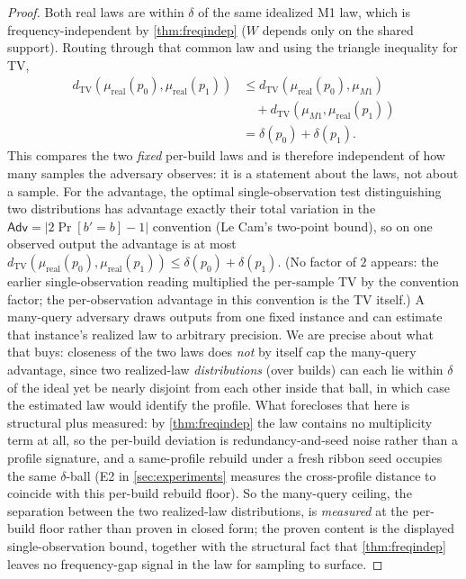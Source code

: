 \documentclass[sigconf,nonacm,anonymous,balance=false]{acmart}
\newcommand{\TV}{d_{\mathrm{TV}}}
\newcommand{\W}{W}                          %
\newcommand{\Adv}{\mathsf{Adv}}             %
\newcommand{\lawreal}{\mu_{\mathrm{real}}}  %
\newcommand{\lawM}{\mu_{M1}}                %
\begin{document}
\begin{proof}
Both real laws are within $\delta$ of the same idealized M1 law, which is
frequency-independent by \cref{thm:freqindep} ($\W$ depends only on the shared support).
Routing through that common law and using the triangle inequality for TV,
\[
  \begin{aligned}
  \TV(\lawreal(p_0), \lawreal(p_1))
  &\le \TV(\lawreal(p_0), \lawM)\\
  &\quad{} + \TV(\lawM, \lawreal(p_1))\\
  &= \delta(p_0) + \delta(p_1).
  \end{aligned}
\]
This compares the two \emph{fixed} per-build laws and is therefore independent of how many
samples the adversary observes: it is a statement about the laws, not about a sample. For
the advantage, the optimal single-observation test distinguishing two distributions has
advantage exactly their total variation in the $\Adv = |2\Pr[b'=b]-1|$ convention (Le Cam's
two-point bound), so on one observed output the advantage is at most
$\TV(\lawreal(p_0), \lawreal(p_1)) \le \delta(p_0) + \delta(p_1)$. (No factor of $2$
appears: the earlier single-observation reading multiplied the per-sample TV by the
convention factor; the per-observation advantage in this convention is the TV itself.)
A many-query adversary draws outputs from one fixed instance and can estimate that
instance's realized law to arbitrary precision. We are precise about what that buys:
closeness of the two laws does \emph{not} by itself cap the many-query advantage, since two
realized-law \emph{distributions} (over builds) can each lie within $\delta$ of the ideal yet
be nearly disjoint from each other inside that ball, in which case the estimated law would
identify the profile. What forecloses that here is structural plus measured: by
\cref{thm:freqindep} the law contains no multiplicity term at all, so the per-build deviation
is redundancy-and-seed noise rather than a profile signature, and a same-profile rebuild under
a fresh ribbon seed occupies the same $\delta$-ball (E2 in \cref{sec:experiments} measures the
cross-profile distance to coincide with this per-build rebuild floor). So the many-query
ceiling, the separation between the two realized-law distributions, is \emph{measured} at the
per-build floor rather than proven in closed form; the proven content is the displayed
single-observation bound, together with the structural fact that \cref{thm:freqindep} leaves
no frequency-gap signal in the law for sampling to surface.
\end{proof}
\end{document}
